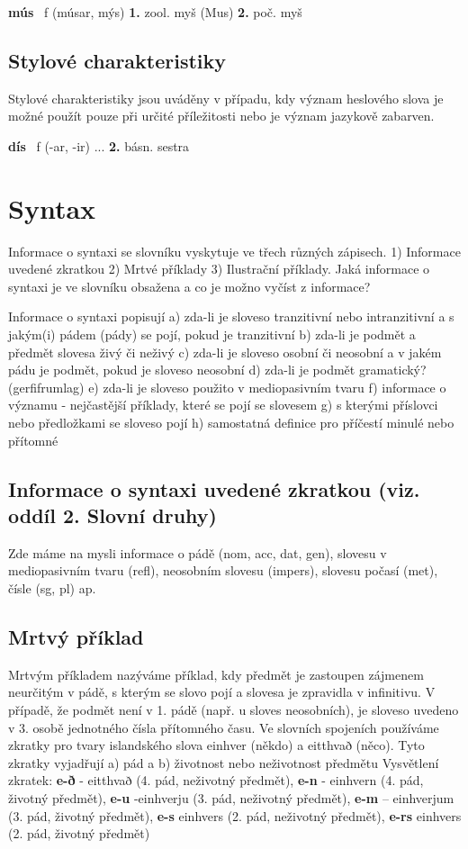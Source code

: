 \documentclass[twocolumn]{book}
\newcommand{\entry}[2]{\hangpara{2em}{1}\textsf{\textbf{#1}}\ #2\markboth{#1}{#1}\par}\nopagebreak[4]
\begin{document}
\entry{mús} {\small{ f (músar, mýs)}
\textbf{1.} \footnotesize{ zool.} { myš } (Mus)
\textbf{2.} \footnotesize{ poč.} { myš } }

\subsection{Stylové charakteristiky}
Stylové charakteristiky jsou uváděny v případu, kdy význam heslového slova je možné použít pouze při určité příležitosti nebo je význam jazykově zabarven.

\entry{dís} {\small{ f (-ar, -ir) }
...
\textbf{2.} \footnotesize{básn.} {sestra} }

\section{Syntax}
Informace o syntaxi se slovníku vyskytuje ve třech různých zápisech. 1) Informace uvedené zkratkou 2) Mrtvé příklady 3) Ilustrační příklady. 
Jaká informace o syntaxi je ve slovníku obsažena a co je možno vyčíst z informace?

Informace o syntaxi popisují
a) zda-li je sloveso tranzitivní nebo intranzitivní a s jakým(i) pádem (pády) se pojí, pokud je tranzitivní
b) zda-li je podmět a předmět slovesa živý či neživý
c) zda-li je sloveso osobní či neosobní a v jakém pádu je podmět, pokud je sloveso neosobní
d) zda-li je podmět gramatický? (gerfifrumlag)
e) zda-li je sloveso použito v mediopasivním tvaru
f) informace o významu - nejčastější příklady, které se pojí se slovesem
g) s kterými příslovci nebo předložkami se sloveso pojí
h) samostatná definice pro příčestí minulé nebo přítomné
\subsection{Informace o syntaxi uvedené zkratkou (viz. oddíl 2. Slovní druhy)}
Zde máme na mysli informace o pádě (nom, acc, dat, gen), slovesu v mediopasivním tvaru (refl), neosobním slovesu (impers), slovesu počasí (met), čísle (sg, pl) ap.
\subsection{Mrtvý příklad}
Mrtvým příkladem nazýváme příklad, kdy předmět je zastoupen zájmenem neurčitým v pádě, s kterým se slovo pojí a slovesa je zpravidla v infinitivu. V případě, že podmět není v 1. pádě (např. u sloves neosobních), je sloveso uvedeno v 3. osobě jednotného čísla přítomného času.
Ve slovních spojeních používáme zkratky pro tvary islandského slova einhver (někdo) a eitthvað (něco). Tyto zkratky vyjadřují a) pád a b) životnost nebo neživotnost předmětu
Vysvětlení zkratek: 
\textbf{e-ð}  - eitthvað (4. pád, neživotný předmět), \textbf{e-n}  - einhvern (4. pád, životný předmět), \textbf{e-u} -einhverju (3. pád, neživotný předmět), \textbf{e-m} – einhverjum (3. pád, životný předmět),  \textbf{e-s} einhvers (2. pád, neživotný předmět), \textbf{e-rs} einhvers (2. pád, životný předmět)
\end{document}
